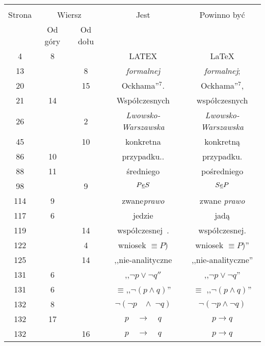 \documentclass[a4paper,11pt]{article}
\begin{document}
\begin{center}
  \begin{tabular}{|c|c|c|c|c|}
    \hline
    & \multicolumn{2}{c|}{} & & \\
    Strona & \multicolumn{2}{c|}{Wiersz} & Jest
                              & Powinno być \\ \cline{2-3}
    & Od góry & Od dołu & & \\
    \hline
    4   &  8 & & LATEX & \LaTeX \\
    13  & &  8 & \emph{formalnej} & \emph{formalnej}; \\
    20  & & 15 & Ockhama''$^{ 7 }$. & Ockhama''$^{ 7 }$, \\
    21  & 14 & & Współczesnych & współczesnych \\
    26  & &  2 & \emph{Lwowsko-\! Warszawska} & \emph{Lwowsko-Warszawska} \\
    45  & & 10 & konkretna & konkretną \\
    86  & 10 & & przypadku.. & przypadku. \\
    88  & 11 & & średniego & pośredniego \\  %
    98  & &  9 & $P \underline{ e } S$ & $S \underline{ e } P$ \\
    114 &  9 & & zwane\emph{prawo} & zwane \emph{prawo} \\
    117 &  6 & & jedzie & jadą \\
    119 & & 14 & współczesnej~. & współczesnej. \\
    122 & &  4 & wniosek $\equiv P$) & wniosek $\equiv P$)'' \\
    125 & & 14 & ,,nie-analityczne  %
           & ,,nie-analityczne'' \\
    131 &  6 & & ,,$\neg p \vee \neg q''$ & ,,$\neg p \vee \neg q$'' \\
    131 &  6 & & $\equiv$,\hspace{2pt},$\neg ( p \land q )$''
           & $\equiv$ ,,$\neg ( p \land q )$'' \\
    132 &  8 & & $\neg( \neg p\;\;\; \land\; \neg q ) $
           & $\neg( \neg p \land \neg q ) $ \\
    132 & 17 & & $p\quad \to \quad q$ & $p \to q$ \\
    132 & & 16 & $p\quad \to \quad q$ & $p \to q$ \\
    \hline
  \end{tabular}
\end{center}
\end{document}
